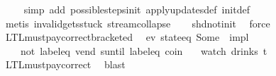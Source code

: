 \begin{isabellebody}
{\ \ \ \isamarkupfalse%
\ {\isacharparenleft}simp\ add{\isacharcolon}\ possible{\isacharunderscore}steps{\isacharunderscore}init\ apply{\isacharunderscore}updates{\isacharunderscore}def\ init{\isacharunderscore}def{\isacharparenright}\isanewline
\ \ \ \isamarkupfalse%
\ {\isacharparenleft}metis\ invalid{\isacharunderscore}gets{\isacharunderscore}stuck\ stream{\isachardot}collapse{\isacharparenright}\isanewline
\ \ \isamarkupfalse%
\ shd{\isacharunderscore}not{\isacharunderscore}init\ \isamarkupfalse%
\ force%
\endisatagproof
{\isafoldproof}%
%
\isadelimproof
%
\endisadelimproof
%
}%
\isamarkupfalse%
\ LTL{\isacharunderscore}must{\isacharunderscore}pay{\isacharunderscore}correct{\isacharunderscore}bracketed{\isacharcolon}\isanewline
\ \ {\isachardoublequoteopen}{\isacharparenleft}{\isacharparenleft}ev\ {\isacharparenleft}state{\isacharunderscore}eq\ {\isacharparenleft}Some\ {}{\isacharparenright}{\isacharparenright}{\isacharparenright}\ impl\isanewline
\ \ \ \ {\isacharparenleft}{\isacharparenleft}not\ {\isacharparenleft}label{\isacharunderscore}eq\ {\isacharprime}{\isacharprime}vend{\isacharprime}{\isacharprime}{\isacharparenright}{\isacharparenright}\ suntil\ label{\isacharunderscore}eq\ {\isacharprime}{\isacharprime}coin{\isacharprime}{\isacharprime}{\isacharparenright}{\isacharparenright}\isanewline
\ \ \ {\isacharparenleft}watch\ drinks\ t{\isacharparenright}{\isachardoublequoteclose}\isanewline
%
\isadelimproof
\ \ %
\endisadelimproof
%
\isatagproof
{}\isamarkupfalse%
\ LTL{\isacharunderscore}must{\isacharunderscore}pay{\isacharunderscore}correct\ \isamarkupfalse%
\ blast%
\endisatagproof
{\isafoldproof}%
%
\isadelimproof
%
\endisadelimproof
%
\end{isabellebody}
